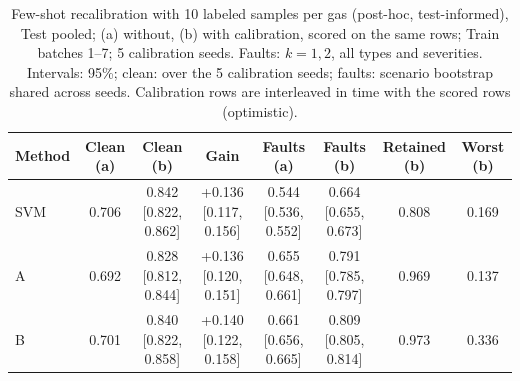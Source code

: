 \begin{table}[t]
\centering
\footnotesize
\caption{Few-shot recalibration with 10 labeled samples per gas (post-hoc, test-informed), Test pooled; (a) without, (b) with calibration, scored on the same rows; Train batches 1--7; 5 calibration seeds. Faults: $k=1,2$, all types and severities. Intervals: 95\%; clean: over the 5 calibration seeds; faults: scenario bootstrap shared across seeds. Calibration rows are interleaved in time with the scored rows (optimistic).}
\label{tab:v2recal}
\setlength{\tabcolsep}{3pt}
\begin{tabular}{lccccccc}
\toprule
Method & Clean (a) & Clean (b) & Gain & Faults (a) & Faults (b) & Retained (b) & Worst (b) \\
\midrule
SVM & 0.706 & 0.842 [0.822, 0.862] & +0.136 [0.117, 0.156] & 0.544 [0.536, 0.552] & 0.664 [0.655, 0.673] & 0.808 & 0.169 \\
A & 0.692 & 0.828 [0.812, 0.844] & +0.136 [0.120, 0.151] & 0.655 [0.648, 0.661] & 0.791 [0.785, 0.797] & 0.969 & 0.137 \\
B & 0.701 & 0.840 [0.822, 0.858] & +0.140 [0.122, 0.158] & 0.661 [0.656, 0.665] & 0.809 [0.805, 0.814] & 0.973 & 0.336 \\
\bottomrule
\end{tabular}
\end{table}
